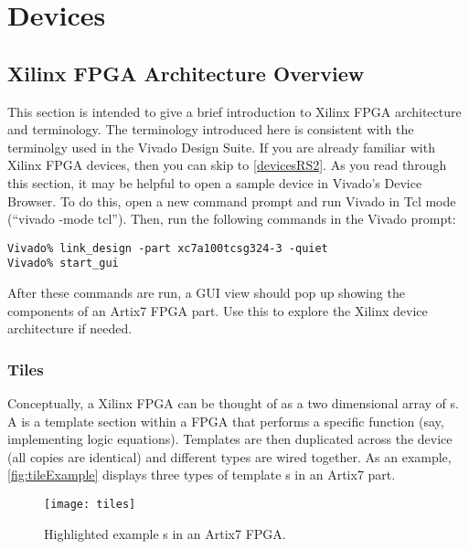 \newpage
\section{Devices}

\subsection{Xilinx FPGA Architecture Overview} \label{fpgaArch}
This section is intended to give a brief introduction to Xilinx FPGA
architecture and terminology. The terminology introduced here is consistent
with the terminolgy used in the Vivado Design Suite. If you are already familiar
with Xilinx FPGA devices, then you can skip to \autoref{devicesRS2}. 
As you read through this section, it may be helpful to open a sample device in Vivado's
Device Browser. To do this, open a new command prompt and run Vivado in Tcl mode
(``vivado -mode tcl''). Then, run the following commands in the Vivado prompt:

\begin{verbatim}
Vivado% link_design -part xc7a100tcsg324-3 -quiet
Vivado% start_gui
\end{verbatim}

\noindent
After these commands are run, a GUI view should pop up showing the components
of an Artix7 FPGA part. Use this to explore the Xilinx device architecture if
needed.

\subsubsection{Tiles}
Conceptually, a Xilinx FPGA can be thought of as a two dimensional
array of s. A  is a template section within a FPGA that
performs a specific function (say, implementing logic equations). Templates are
then duplicated across the device (all copies are identical) and different
 types are wired together. As an example, \autoref{fig:tileExample}
displays three types of template s in an Artix7 part.

\begin{figure}[H]
 \centering
 \texttt{[image: tiles]}
 \caption{Highlighted example s in an Artix7 FPGA.}
 \label{fig:tileExample}
\end{figure}

